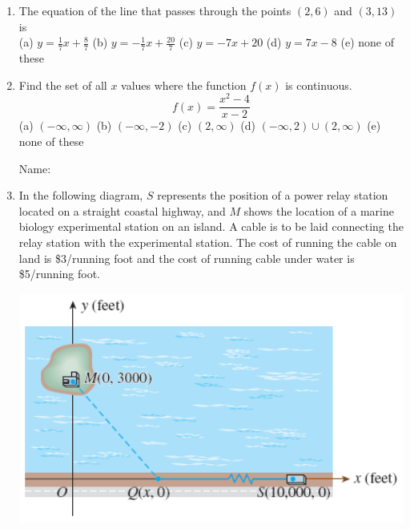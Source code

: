 \documentclass[fleqn,12pt]{article}
\newcommand{\<}{\ensuremath{\langle}}
\renewcommand{\>}{\ensuremath{\rangle}}
\begin{document}
\begin{enumerate}[label={\bf \arabic*.}]

  \item The equation of the line that passes through the points
    $(2, 6)$ and $(3, 13)$ is
    \\[6pt]
    (a) $y = \frac{1}{7}x +\frac{8}{7}$\hfill
    (b) $y = -\frac{1}{7}x + \frac{20}{7}$\hfill
    (c) $y = -7x + 20$\hfill
    (d) $y = 7x - 8$\hfill
    (e) none of these

    \probskip

  \item Find the set of all $x$ values where the function $f(x)$  is continuous.
    \[
    f(x) = \frac{x^2-4}{x-2}
    \]
    (a) $(-\infty, \infty)$\hfill
    (b) $(-\infty, -2)$\hfill
    (c) $(2,\infty)$\hfill
    (d) $(-\infty, 2)\cup (2,\infty)$\hfill
    (e) none of these

    \newpage


\begin{flushright}
  Name: \underline{\phantom{XXXXXXXXXXXXXXXXX}}
\end{flushright}

  \item In the following diagram, $S$ represents the position of a power relay
    station located on a straight coastal highway, and $M$ shows the location of a
    marine biology experimental station on an island. A cable is to be laid
    connecting the relay station with the experimental station. The cost of
    running the cable on land is \$3/running foot and the cost of running cable
    under water is \$5/running foot.  

    \begin{center}
      \includegraphics[height=3in]{1-3-040}
    \end{center}


\end{enumerate}
\end{document}
